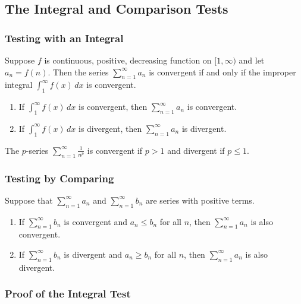 \subsection{The Integral and Comparison Tests}

\subsubsection*{Testing with an Integral}

\begin{theorem}
    Suppose \(f\) is continuous, positive, decreasing function on
    \([1,\infty)\) and let \(a_n=f(n)\).
    Then the series \(\displaystyle{\sum_{n=1}^\infty a_n}\) is convergent if
    and only if the improper integral
    \(\displaystyle{\int_1^\infty f(x)\,dx}\) is convergent.
    \begin{enumerate}
        \item If \(\displaystyle{\int_1^\infty f(x)\,dx}\) is convergent, then
        \(\displaystyle{\sum_{n=1}^\infty a_n}\) is convergent.
        \item If \(\displaystyle{\int_1^\infty f(x)\,dx}\) is divergent, then
        \(\displaystyle{\sum_{n=1}^\infty a_n}\) is divergent.
    \end{enumerate}
\end{theorem}
The \(p\)-series \(\displaystyle{\sum_{n=1}^\infty \frac{1}{n^p}}\) is
convergent if \(p>1\) and divergent if \(p\leq 1\).

\subsubsection*{Testing by Comparing}

\begin{theorem}
    Suppose that \(\displaystyle{\sum_{n=1}^\infty a_n}\) and
    \(\displaystyle{\sum_{n=1}^\infty b_n}\) are series with positive terms.
    \begin{enumerate}
        \item If \(\displaystyle{\sum_{n=1}^\infty b_n}\) is convergent and
        \(a_n\leq b_n\) for all \(n\), then
        \(\displaystyle{\sum_{n=1}^\infty a_n}\) is also convergent.
        \item If \(\displaystyle{\sum_{n=1}^\infty b_n}\) is divergent and
        \(a_n\geq b_n\) for all \(n\), then
        \(\displaystyle{\sum_{n=1}^\infty a_n}\) is also divergent.
    \end{enumerate}
\end{theorem}

\subsubsection*{Proof of the Integral Test}